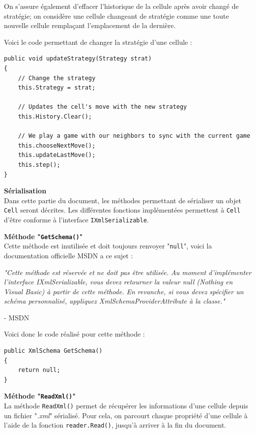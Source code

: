 \documentclass[a4paper]{article}
\begin{document}
On s'assure également d'effacer l'historique de la cellule après avoir changé de stratégie; on considère une cellule changeant de stratégie comme une toute nouvelle cellule remplaçant l'emplacement de la dernière.

Voici le code permettant de changer la stratégie d'une cellule :

\begin{lstlisting}
public void updateStrategy(Strategy strat)
{
    // Change the strategy
    this.Strategy = strat;

    // Updates the cell's move with the new strategy
    this.History.Clear();

    // We play a game with our neighbors to sync with the current game
    this.chooseNextMove();
    this.updateLastMove();
    this.step();
}
\end{lstlisting}
\pagebreak
\textbf{Sérialisation}\\
Dans cette partie du document, les méthodes permettant de sérialiser un objet \texttt{Cell} seront décrites. Les différentes fonctions implémentées permettent à \texttt{Cell} d'être conforme à l'interface \texttt{IXmlSerializable}.

\textbf{Méthode "\texttt{GetSchema()}"}\\
Cette méthode est inutilisée et doit toujours renvoyer "\texttt{null}", voici la documentation officielle MSDN a ce sujet :

\begin{framed}
\textit{
"Cette méthode est réservée et ne doit pas être utilisée. Au moment d’implémenter l’interface IXmlSerializable, vous devez retourner la valeur null (Nothing en Visual Basic) à partir de cette méthode. En revanche, si vous devez spécifier un schéma personnalisé, appliquez XmlSchemaProviderAttribute à la classe."
}

\hfill - MSDN
\end{framed}

Voici donc le code réalisé pour cette méthode :

\begin{lstlisting}
public XmlSchema GetSchema()
{
    return null;
}
\end{lstlisting}


\textbf{Méthode "\texttt{ReadXml()}"}\\
La méthode \texttt{ReadXml()} permet de récupérer les informations d'une cellule depuis un fichier "\textit{.xml}" sérialisé. Pour cela, on parcourt chaque propriété d'une cellule à l'aide de la fonction \texttt{reader.Read()}, jusqu'à arriver à la fin du document.
\end{document}
